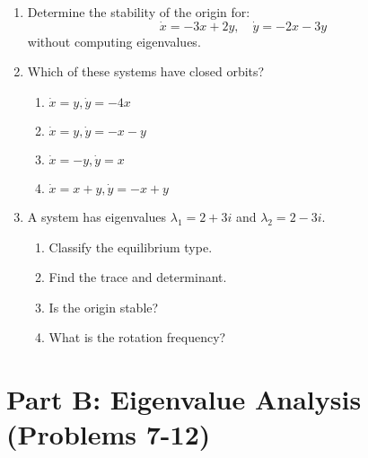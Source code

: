 \documentclass[12pt]{article}
\begin{document}
\begin{enumerate}
\item Determine the stability of the origin for:
$$\dot{x} = -3x + 2y, \quad \dot{y} = -2x - 3y$$
without computing eigenvalues.

\item Which of these systems have closed orbits?
\begin{enumerate}[label=(\alph*)]
    \item $\dot{x} = y, \dot{y} = -4x$
    \item $\dot{x} = y, \dot{y} = -x - y$
    \item $\dot{x} = -y, \dot{y} = x$
    \item $\dot{x} = x + y, \dot{y} = -x + y$
\end{enumerate}

\item A system has eigenvalues $\lambda_{1} = 2 + 3i$ and $\lambda_{2} = 2 - 3i$.
\begin{enumerate}[label=(\alph*)]
    \item Classify the equilibrium type.
    \item Find the trace and determinant.
    \item Is the origin stable?
    \item What is the rotation frequency?
\end{enumerate}
\end{enumerate}

\section*{Part B: Eigenvalue Analysis (Problems 7-12)}
\end{document}
